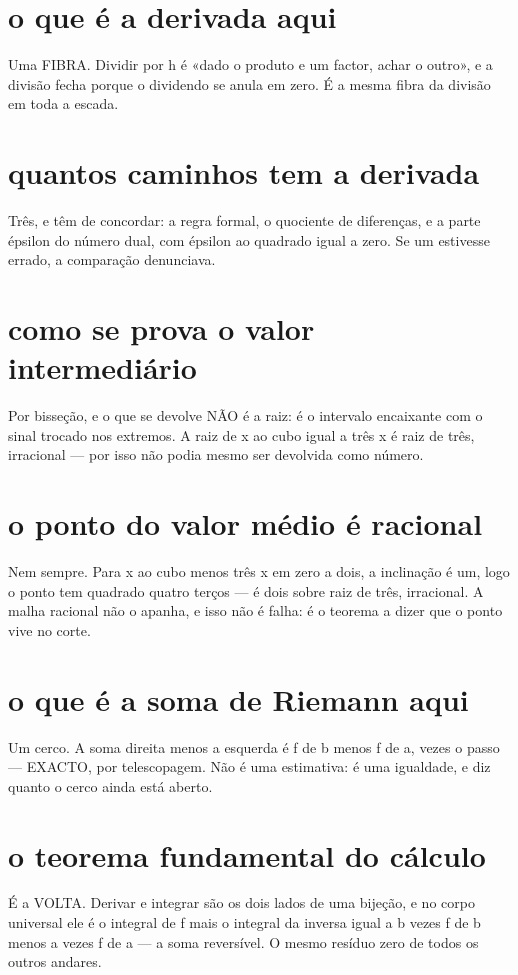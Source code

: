 \documentclass[11pt,a4paper]{article}
\begin{document}
\section{o que é a derivada aqui}
Uma FIBRA. Dividir por h é «dado o produto e um factor, achar o outro», e a divisão
fecha porque o dividendo se anula em zero. É a mesma fibra da divisão em toda a escada.

\section{quantos caminhos tem a derivada}
Três, e têm de concordar: a regra formal, o quociente de diferenças, e a parte épsilon
do número dual, com épsilon ao quadrado igual a zero. Se um estivesse errado, a
comparação denunciava.

\section{como se prova o valor intermediário}
Por bisseção, e o que se devolve NÃO é a raiz: é o intervalo encaixante com o sinal
trocado nos extremos. A raiz de x ao cubo igual a três x é raiz de três, irracional —
por isso não podia mesmo ser devolvida como número.

\section{o ponto do valor médio é racional}
Nem sempre. Para x ao cubo menos três x em zero a dois, a inclinação é um, logo o ponto
tem quadrado quatro terços — é dois sobre raiz de três, irracional. A malha racional não
o apanha, e isso não é falha: é o teorema a dizer que o ponto vive no corte.

\section{o que é a soma de Riemann aqui}
Um cerco. A soma direita menos a esquerda é f de b menos f de a, vezes o passo —
EXACTO, por telescopagem. Não é uma estimativa: é uma igualdade, e diz quanto o cerco
ainda está aberto.

\section{o teorema fundamental do cálculo}
É a VOLTA. Derivar e integrar são os dois lados de uma bijeção, e no corpo universal ele
é o integral de f mais o integral da inversa igual a b vezes f de b menos a vezes f de a
— a soma reversível. O mesmo resíduo zero de todos os outros andares.
\end{document}
